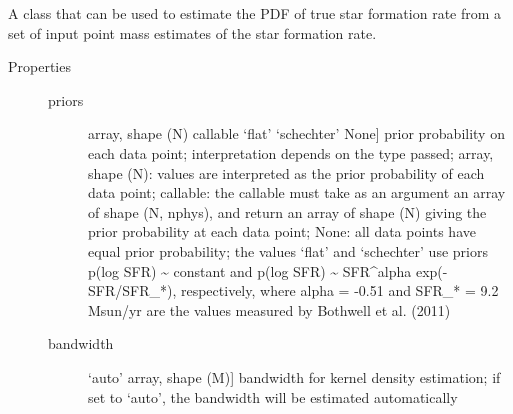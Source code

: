 \documentclass[letterpaper,10pt,english]{sphinxmanual}
\begin{document}
\begin{fulllineitems}
\label{\detokenize{sfr_slug:slugpy.sfr_slug.sfr_slug}}
A class that can be used to estimate the PDF of true star
formation rate from a set of input point mass estimates of the
star formation rate.
\begin{description}
\item[{Properties}] \leavevmode\begin{description}
\item[{priors}] \leavevmode{[}array, shape (N) \textbar{} callable \textbar{} ‘flat’ \textbar{} ‘schechter’ \textbar{} None{]}
prior probability on each data point; interpretation
depends on the type passed; array, shape (N): values are
interpreted as the prior probability of each data point;
callable: the callable must take as an argument an array
of shape (N, nphys), and return an array of shape (N)
giving the prior probability at each data point; None:
all data points have equal prior probability; the values
‘flat’ and ‘schechter’ use priors p(log SFR) \textasciitilde{} constant and
p(log SFR) \textasciitilde{} SFR\textasciicircum{}alpha exp(-SFR/SFR\_*), respectively, where
alpha = -0.51 and SFR\_* = 9.2 Msun/yr are the values
measured by Bothwell et al. (2011)

\item[{bandwidth}] \leavevmode{[}‘auto’ \textbar{} array, shape (M){]}
bandwidth for kernel density estimation; if set to
‘auto’, the bandwidth will be estimated automatically

\end{description}

\end{description}

\begin{fulllineitems}
\label{\detokenize{sfr_slug:slugpy.sfr_slug.sfr_slug.__init__}}~\begin{quote}


\end{quote}
\end{fulllineitems}
\end{fulllineitems}
\end{document}
